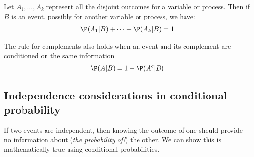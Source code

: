 


\begin{termBox}{
Let $A_1,\dots,A_k$ represent all the disjoint outcomes for a variable or process. Then if $B$ is an event, possibly for another variable or process, we have: \vspace{-1mm}
\begin{eqnarray*}
\P(A_1|B)+\cdots+\P(A_k|B) = 1
\end{eqnarray*}\vspace{-5.5mm} \par
The rule for complements also holds when an event and its complement are conditioned on the same information: \vspace{-1.5mm}
\begin{eqnarray*}
\P(A | B) = 1 - \P(A^c | B)
\end{eqnarray*}}
\end{termBox}

\subsection{Independence considerations in conditional probability}

If two events are independent, then knowing the outcome of one should provide no information about (\emph{the probability of!}) the other. We can show this is mathematically true using conditional probabilities.

